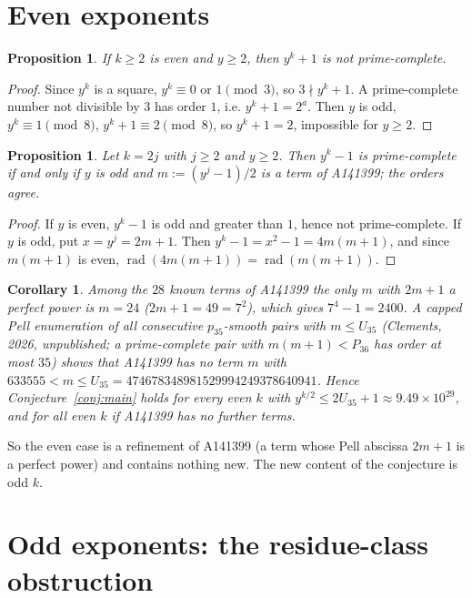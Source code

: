 \documentclass[11pt]{article}
\newtheorem{proposition}[theorem]{Proposition}
\newtheorem{corollary}[theorem]{Corollary}
\theoremstyle{definition}
\theoremstyle{remark}
\newcommand{\rad}{\operatorname{rad}}
\begin{document}
\section{Even exponents}\label{sec:even}

\begin{proposition}\label{prop:plus-even}
If $k\ge2$ is even and $y\ge2$, then $y^k+1$ is not prime-complete.
\end{proposition}
\begin{proof}
Since $y^k$ is a square, $y^k\equiv0$ or $1\pmod3$, so $3\nmid y^k+1$. A
prime-complete number not divisible by $3$ has order $1$, i.e. $y^k+1=2^a$.
Then $y$ is odd, $y^k\equiv1\pmod8$, $y^k+1\equiv2\pmod8$, so $y^k+1=2$,
impossible for $y\ge2$.
\end{proof}

\begin{proposition}\label{prop:minus-even}
Let $k=2j$ with $j\ge2$ and $y\ge2$. Then $y^k-1$ is prime-complete if and only
if $y$ is odd and $m:=(y^j-1)/2$ is a term of A141399; the orders agree.
\end{proposition}
\begin{proof}
If $y$ is even, $y^k-1$ is odd and greater than $1$, hence not prime-complete.
If $y$ is odd, put $x=y^j=2m+1$. Then $y^k-1=x^2-1=4m(m+1)$, and since
$m(m+1)$ is even, $\rad(4m(m+1))=\rad(m(m+1))$.
\end{proof}

\begin{corollary}\label{cor:even}
Among the $28$ known terms of A141399 the only $m$ with $2m+1$ a perfect power
is $m=24$ ($2m+1=49=7^2$), which gives $7^4-1=2400$. A capped Pell enumeration
of all consecutive $p_{35}$-smooth pairs with $m\le U_{35}$ (Clements, 2026,
unpublished; a prime-complete pair with $m(m+1)<P_{36}$ has order at most $35$) shows that A141399 has no term $m$ with
$633555<m\le U_{35}=474678348981529994249378640941$. Hence
Conjecture~\ref{conj:main} holds for every even $k$ with
$y^{k/2}\le 2U_{35}+1\approx9.49\times10^{29}$, and for all even $k$ if
A141399 has no further terms.
\end{corollary}

So the even case is a refinement of A141399 (a term whose Pell abscissa
$2m+1$ is a perfect power) and contains nothing new. The new content of the
conjecture is odd $k$.

\section{Odd exponents: the residue-class obstruction}\label{sec:odd}
\end{document}
